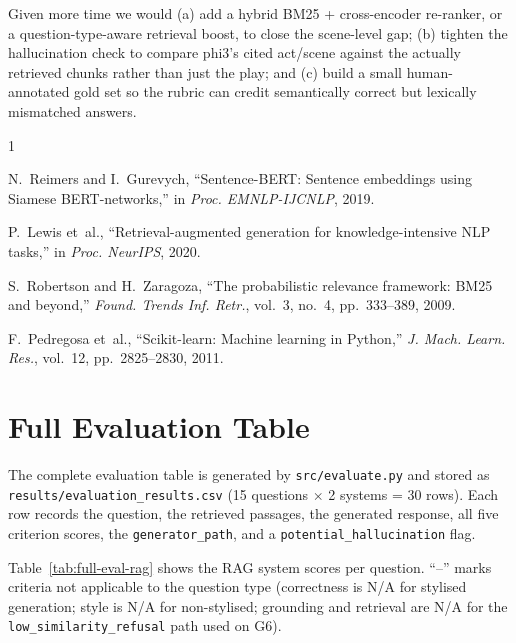 \documentclass[10pt,conference]{IEEEtran}
\begin{document}
Given more time we would (a) add a hybrid BM25 + cross-encoder
re-ranker, or a question-type-aware retrieval boost, to close the
scene-level gap; (b) tighten the hallucination check to compare
phi3's cited act/scene against the actually retrieved chunks rather
than just the play; and (c) build a small human-annotated gold set
so the rubric can credit semantically correct but lexically
mismatched answers.

\begin{thebibliography}{1}

N.~Reimers and I.~Gurevych, ``Sentence-BERT: Sentence embeddings using
Siamese BERT-networks,'' in \emph{Proc. EMNLP-IJCNLP}, 2019.

P.~Lewis et~al., ``Retrieval-augmented generation for
knowledge-intensive NLP tasks,'' in \emph{Proc. NeurIPS}, 2020.

S.~Robertson and H.~Zaragoza, ``The probabilistic relevance framework:
BM25 and beyond,'' \emph{Found. Trends Inf. Retr.}, vol.~3, no.~4,
pp.~333--389, 2009.

F.~Pedregosa et~al., ``Scikit-learn: Machine learning in Python,''
\emph{J. Mach. Learn. Res.}, vol.~12, pp.~2825--2830, 2011.

\end{thebibliography}

\appendices

\section{Full Evaluation Table}
\label{app:evaluation}

The complete evaluation table is generated by \verb|src/evaluate.py|
and stored as \verb|results/evaluation_results.csv| (15 questions
$\times$ 2 systems = 30 rows). Each row records the question, the
retrieved passages, the generated response, all five criterion scores,
the \texttt{generator\_path}, and a \texttt{potential\_hallucination}
flag.

Table~\ref{tab:full-eval-rag} shows the RAG system scores per
question. ``--'' marks criteria not applicable to the question type
(correctness is N/A for stylised generation; style is N/A for
non-stylised; grounding and retrieval are N/A for the
\texttt{low\_similarity\_refusal} path used on G6).
\end{document}
